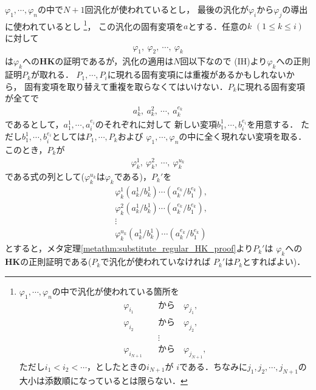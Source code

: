 \begin{metaprf}
\begin{description}
				$\varphi_{1},\cdots,\varphi_{n}$の中で$N+1$回汎化が使われているとし，
				最後の汎化が$\varphi_{i}$から$\varphi_{j}$の導出に使われているとし
				\footnote{
					$\varphi_{1},\cdots,\varphi_{n}$の中で汎化が使われている箇所を
					\begin{align}
						\varphi_{i_{1}} \quad &\mbox{から} \quad \varphi_{j_{1}}, \\
						\varphi_{i_{2}} \quad &\mbox{から} \quad \varphi_{j_{2}}, \\
						&\vdots \\
						\varphi_{i_{N+1}} \quad &\mbox{から} \quad \varphi_{j_{N+1}},
					\end{align}
					ただし$i_{1}<i_{2}<\cdots$，としたときの$i_{N+1}$が
					$i$である．ちなみに$j_{1},j_{2},\cdots,j_{N+1}$の
					大小は添数順になっているとは限らない．
				}，
				この汎化の固有変項を$a$とする．任意の$k$ $(1 \leq k \leq i)$に対して
				\begin{align}
					\varphi_{1},\ \varphi_{2},\ \cdots,\ \varphi_{k}
				\end{align}
				は$\varphi_{k}$への{\bf HK}の証明であるが，汎化の適用は$N$回以下なので
				(IH)より$\varphi_{k}$への正則証明$P_{k}$が取れる．
				$P_{1},\cdots,P_{i}$に現れる固有変項には重複があるかもしれないから，
				固有変項を取り替えて重複を取らなくてはいけない．$P_{k}$に現れる固有変項が全てで
				\begin{align}
					a_{k}^{1},\ a_{k}^{2},\ \cdots,\ a_{k}^{e_{k}}
				\end{align}
				であるとして，$a_{1}^{1},\cdots,a_{i}^{e_{i}}$のそれぞれに対して
				新しい変項$b_{1}^{1},\cdots,b_{i}^{e_{i}}$を用意する．
				ただし$b_{1}^{1},\cdots,b_{i}^{e_{i}}$としては$P_{1},\cdots,P_{k}$および
				$\varphi_{1},\cdots,\varphi_{n}$の中に全く現れない変項を取る．
				このとき，$P_{k}$が
				\begin{align}
					\varphi_{k}^{1},\ \varphi_{k}^{2},\ \cdots,\ \varphi_{k}^{u_{k}}
				\end{align}
				である式の列として($\varphi_{k}^{u_{k}}$は$\varphi_{k}$である)，$P_{k}'$を
				\begin{align}
					&\varphi_{k}^{1}(a_{k}^{1}/b_{k}^{1})\cdots(a_{k}^{e_{k}}/b_{1}^{e_{k}}), \\
					&\varphi_{k}^{2}(a_{k}^{1}/b_{k}^{1})\cdots(a_{k}^{e_{k}}/b_{1}^{e_{k}}), \\
					&\vdots \\ 
					&\varphi_{k}^{u_{k}}(a_{k}^{1}/b_{k}^{1})\cdots(a_{k}^{e_{k}}/b_{1}^{e_{k}})
				\end{align}
				とすると，メタ定理\ref{metathm:substitute_regular_HK_proof}より$P_{k}'$は
				$\varphi_{k}$への{\bf HK}の正則証明である($P_{k}$で汎化が使われていなければ
				$P_{k}'$は$P_{k}$とすればよい)．
				

\end{description}
\end{metaprf}
